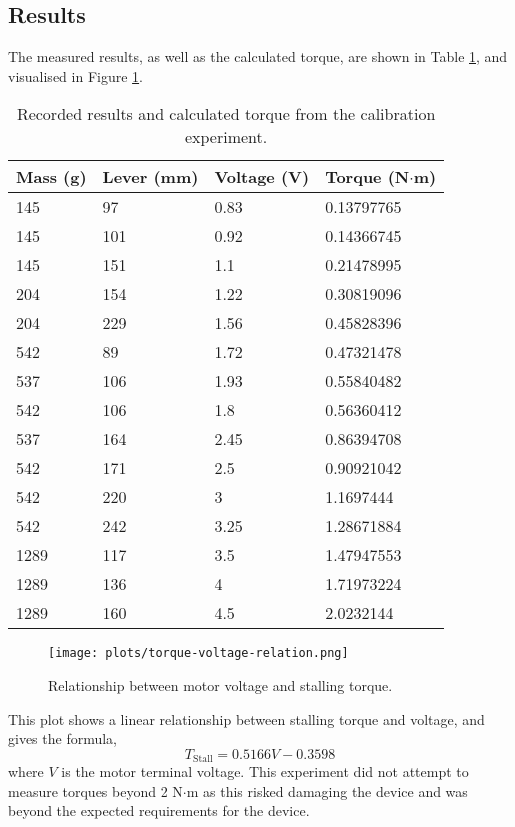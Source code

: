\subsection{Results}
The measured results, as well as the calculated torque, are shown in Table \ref{voltage-torque-table}, and visualised in Figure \ref{torque-voltage-plot}.

\begin{table}[!ht]
	\centering
	\caption{Recorded results and calculated torque from the calibration experiment.}
	\label{voltage-torque-table}
	\begin{tabular}{|l|l|l|l|}
		\hline
		Mass (g) & Lever (mm) & Voltage (V) & Torque (N$\cdot$m) \\ \hline
		145 & 97 & 0.83 & 0.13797765 \\ \hline
		145 & 101 & 0.92 & 0.14366745 \\ \hline
		145 & 151 & 1.1 & 0.21478995 \\ \hline
		204 & 154 & 1.22 & 0.30819096 \\ \hline
		204 & 229 & 1.56 & 0.45828396 \\ \hline
		542 & 89 & 1.72 & 0.47321478 \\ \hline
		537 & 106 & 1.93 & 0.55840482 \\ \hline
		542 & 106 & 1.8 & 0.56360412 \\ \hline
		537 & 164 & 2.45 & 0.86394708 \\ \hline
		542 & 171 & 2.5 & 0.90921042 \\ \hline
		542 & 220 & 3 & 1.1697444 \\ \hline
		542 & 242 & 3.25 & 1.28671884 \\ \hline
		1289 & 117 & 3.5 & 1.47947553 \\ \hline
		1289 & 136 & 4 & 1.71973224 \\ \hline
		1289 & 160 & 4.5 & 2.0232144 \\ \hline
	\end{tabular}
\end{table}

\begin{figure}[!h]
	\centering
	\texttt{[image: plots/torque-voltage-relation.png]}
	\caption{Relationship between motor voltage and stalling torque.}
	\label{torque-voltage-plot}
\end{figure}

This plot shows a linear relationship between stalling torque and voltage, and gives the formula,
\begin{equation}
	T_\mathrm{Stall} =  0.5166 V - 0.3598 \label{eqTorqueVoltage}
\end{equation}
where $V$ is the motor terminal voltage.
This experiment did not attempt to measure torques beyond 2 N$\cdot$m as this risked damaging the device and was beyond the expected requirements for the device.



